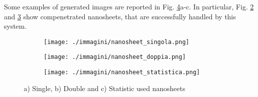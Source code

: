 Some examples of generated images are reported in Fig. \ref{fig:nanosheet}a-c. In particular, Fig. \ref{fig:nanosheet_b} and \ref{fig:nanosheet_c} show compenetrated nanosheets, that are successfully handled by this system.

\begin{figure}[ht]
    \centering
    \begin{subfigure}[b]{0.32\textwidth}
        \texttt{[image: ./immagini/nanosheet\_singola.png]}
        \caption{}
        \label{fig:nanosheet_a}
    \end{subfigure}
    \hfill
    \begin{subfigure}[b]{0.32\textwidth}
        \texttt{[image: ./immagini/nanosheet\_doppia.png]}
        \caption{}
        \label{fig:nanosheet_b}
    \end{subfigure}
    \hfill
    \begin{subfigure}[b]{0.32\textwidth}
        \texttt{[image: ./immagini/nanosheet\_statistica.png]}
        \caption{}
        \label{fig:nanosheet_c}
    \end{subfigure}
    \caption{a) Single, b) Double and  c) Statistic used nanosheets}
    \label{fig:nanosheet}
\end{figure}